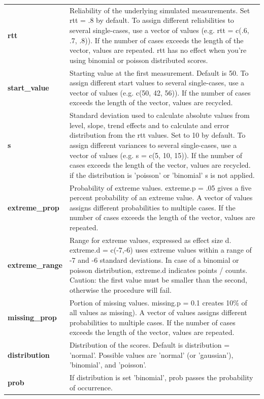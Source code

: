 \documentclass[
]{book}
\begin{document}
\begin{table}
\begin{tabular}[t]{>{\raggedright\arraybackslash}p{15em}>{\raggedright\arraybackslash}p{30em}}
\textbf{rtt} & Reliability of the underlying simulated measurements. Set rtt = .8 by default. To assign different reliabilities to several single-cases, use a vector of values (e.g. rtt = c(.6, .7, .8)). If the number of cases exceeds the length of the vector, values are repeated. rtt has no effect when you're using binomial or poisson distributed scores.\\
\textbf{start\_value} & Starting value at the first measurement. Default is 50. To assign different start values to several single-cases, use a vector of values (e.g. c(50, 42, 56)). If the number of cases exceeds the length of the vector, values are recycled.\\
\textbf{s} & Standard deviation used to calculate absolute values from level, slope, trend effects and to calculate and error distribution from the rtt values. Set to 10 by default. To assign different variances to several single-cases, use a vector of values (e.g. s = c(5, 10, 15)). If the number of cases exceeds the length of the vector, values are recycled. if the distribution is 'poisson' or 'binomial' s is not applied.\\
\textbf{extreme\_prop} & Probability of extreme values. extreme.p = .05 gives a five percent probability of an extreme value. A vector of values assigns different probabilities to multiple cases. If the number of cases exceeds the length of the vector, values are repeated.\\
\textbf{extreme\_range} & Range for extreme values, expressed as effect size d. extreme.d = c(-7,-6) uses extreme values within a range of -7 and -6 standard deviations. In case of a binomial or poisson distribution, extreme.d indicates points / counts. Caution: the first value must be smaller than the second, otherwise the procedure will fail.\\
\textbf{missing\_prop} & Portion of missing values. missing.p = 0.1 creates 10\% of all values as missing). A vector of values assigns different probabilities to multiple cases. If the number of cases exceeds the length of the vector, values are repeated.\\
\textbf{distribution} & Distribution of the scores. Default is distribution = 'normal'. Possible values are 'normal' (or 'gaussian'), 'binomial', and 'poisson'.\\
\textbf{prob} & If distribution is set 'binomial', prob passes the probability of occurrence.\\
\bottomrule
\end{tabular}
\end{table}
\end{document}
